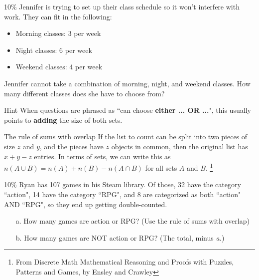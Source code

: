 \documentclass[a4paper,12pt]{book}
\begin{document}
        \hrulefill

        \newpage
        \begin{question}{2}{10\%}
            Jennifer is trying to set up their class schedule so it won't
            interfere with work. They can fit in the following:
            \begin{itemize}
                \item Morning classes: 3 per week
                \item Night classes: 6 per week
                \item Weekend classes: 4 per week
            \end{itemize}
            Jennifer cannot take a combination of morning,
            night, and weekend classes. How many different classes
            does she have to choose from?
        \end{question}
        
        \begin{hint}{Hint}
            When questions are phrased as ``can choose \textbf{either ... OR ...}",
            this usually points to \textbf{adding} the size of both sets.
        \end{hint}

    
    \begin{intro}{The rule of sums with overlap}
        If the list to count can be split into two pieces of size $z$
        and $y$, and the pieces have $z$ objects in common, then the original
        list has $x + y - z$ entries. In terms of sets, we can write this as
        $n(A \cup B) = n(A) + n(B) - n(A \cap B)$ for all sets $A$ and $B$.
    \footnote{From Discrete Math Mathematical Reasoning and Proofs with Puzzles, Patterns and Games, by Ensley and Crawley}
    \end{intro}

        \begin{question}{3}{10\%}
            Ryan has 107 games in his Steam library.
            Of those, 32 have the category ``action",
            14 have the category ``RPG",
            and 8 are categorized as both ``action" AND ``RPG", so they end up getting double-counted.
        \end{question}

        \begin{enumerate}
            \item[a.] How many games are action or RPG? (Use the rule of sums with overlap)
            \item[b.] How many games are NOT action or RPG? (The total, minus \textit{a.})
        \end{enumerate}
    
\end{document}
